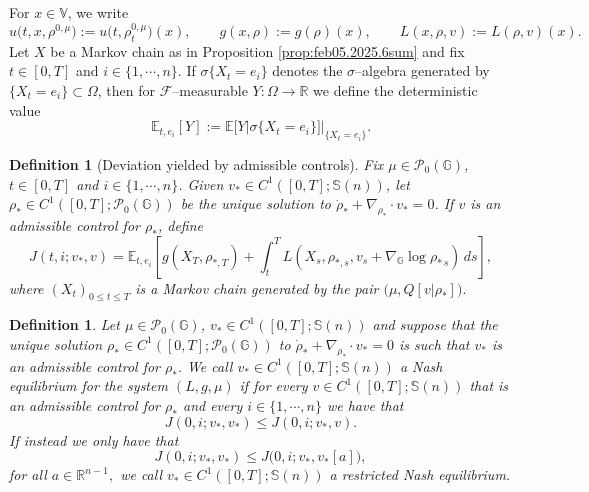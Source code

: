 \documentclass[10pt]{article}
\newtheorem{definition}[theorem]{Definition}
\numberwithin{equation}{section}
\newcommand{\cF}{ \mathcal{F}}
\newcommand{\cP}{ \mathcal{P}}
\newcommand{\bE}{\mathbb E}
\newcommand{\bR}{\mathbb R}
\newcommand{\bS}{\mathbb S}
\newcommand{\bV}{\mathbb V}
\def\G{\mathbb{G}}
\begin{document}
For $x \in \bV$, we write
\[
u\big(t,x,\rho^{0,\mu}\big):=u\big(t,\rho_t^{0,\mu}\big)(x), \qquad g(x,\rho):=g(\rho)(x), \qquad L(x,\rho,v):=L(\rho,v)(x).
\]
%
%
Let $X$ be a Markov chain as in Proposition \ref{prop:feb05.2025.6sum} and fix $t \in [0, T]$ and $i\in \{1, \cdots, n\}$. If $\sigma\{X_t=e_i\}$ denotes the $\sigma$--algebra generated by $\{X_t=e_i\} \subset \Omega$, then for $\cF$--measurable $Y: \Omega \to \bR$   we define the deterministic value
\[
\bE_{t, e_i}[Y]:=\bE\big[Y\big | \sigma\{X_t=e_i\}\big]\big|_{\{X_t=e_i\}}.
\]
%
%
\begin{definition}[Deviation yielded by admissible controls]\label{def:J} Fix $\mu\in \cP_0(\G)$, $t\in[0,T]$ and $i\in \{1, \cdots, n\}$. Given $v_* \in C^1([0, T]; \bS(n))$, let $\rho_* \in C^1([0, T]; \cP_0(\G))$ be the unique solution to $\dot \rho_*+\nabla_{\rho_*} \cdot v_*=0$.  If $v$ is an admissible control for $\rho_*$, define
\begin{equation}\label{eq:J_def}
J(t,i;v_*,v)=\mathbb E_{t,e_i}\left[g(X_T,\rho_{*,T})+\int_t^TL(X_s,\rho_{*,s},v_s +\nabla_\G \log \rho_{*\, s})\,ds\right],
\end{equation}
where $(X_t)_{0 \leq t\leq T}$ is a Markov chain generated by the pair $\big(\mu, Q[v|\rho_*]\big).$
\end{definition}
%
%
\begin{definition}\label{defn:mar10.2026.2} Let $\mu \in \cP_0(\G)$, $v_* \in C^1([0, T]; \bS(n))$ and suppose that the unique solution $\rho_* \in C^1([0, T]; \cP_0(\G))$ to $\dot \rho_*+\nabla_{\rho_*} \cdot v_*=0$ is such that $v_*$ is an admissible control for $\rho_*.$  We call $v_* \in C^1([0, T]; \bS(n))$ a Nash equilibrium for the system $(L, g, \mu)$ if for every $v \in C^1([0, T]; \bS(n))$ that is an admissible control for $\rho_*$ and every $i \in \{1, \cdots, n\}$ we have that
\[
J(0,i; v_*,v_*) \leq J(0,i;v_*,v).
\]
If instead we only have that 
\[
J(0,i;v_*,v_*) \leq J\big(0,i;v_*,v_*[a]\big),
\]
for all $a \in \bR^{n-1},$ we call $v_* \in C^1([0, T]; \bS(n))$ a restricted Nash equilibrium.%
\end{definition}
\end{document}
